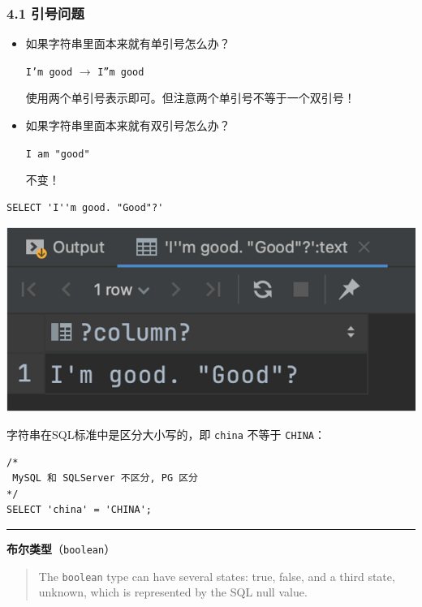 \documentclass[aspectratio=169, 14pt]{beamer}
\begin{document}
\begin{frame}
	\frametitle{4.1 引号问题}
	\begin{itemize}
		\item<1-> 如果字符串里面本来就有单引号怎么办？

		      \texttt{I'm good} $\rightarrow$ \texttt{I''m good}

		      使用两个单引号表示即可。但注意\alert{两个单引号不等于一个双引号}！
		\item<2-> 如果字符串里面本来就有双引号怎么办？

		      \texttt{I am "good"}

		      不变！
	\end{itemize}

\end{frame}

\begin{frame}[fragile]
	\begin{verbatim} 
SELECT 'I''m good. "Good"?'
    \end{verbatim}

	\includegraphics[height=.6\paperheight]{week4/good}
\end{frame}

\begin{frame}[fragile]
	字符串在SQL标准中是区分大小写的，即 \texttt{china} 不等于 \texttt{CHINA}：
	\begin{verbatim} 
/*
 MySQL 和 SQLServer 不区分, PG 区分
*/
SELECT 'china' = 'CHINA';
\end{verbatim}
	\pause
	\noindent\rule{\textwidth}{1pt}
	\textbf{布尔类型}（\texttt{boolean}）
	\begin{quote}
		The \texttt{boolean} type can have several states: \alert{true}, \alert{false}, and a third state, \alert{unknown}, which is represented by the SQL \alert{null} value.
	\end{quote}

\end{frame}
\end{document}
